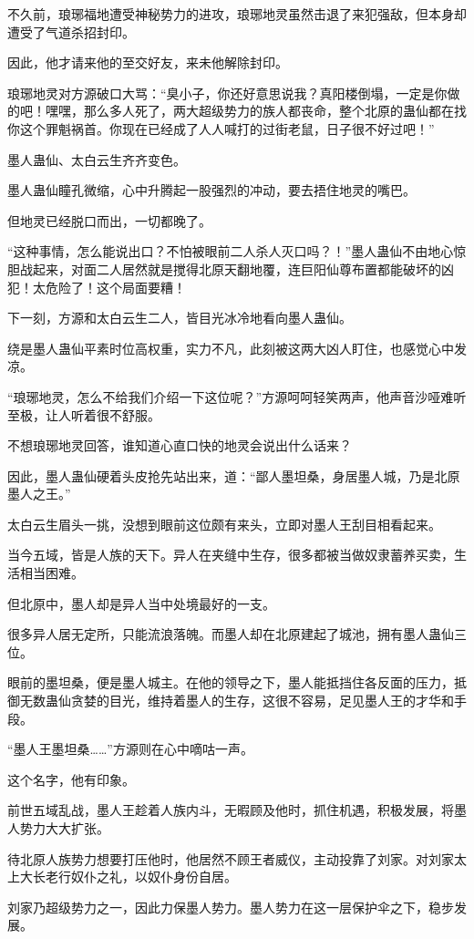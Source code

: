 \begin{this_body}
不久前，琅琊福地遭受神秘势力的进攻，琅琊地灵虽然击退了来犯强敌，但本身却遭受了气道杀招封印。

因此，他才请来他的至交好友，来未他解除封印。

琅琊地灵对方源破口大骂：“臭小子，你还好意思说我？真阳楼倒塌，一定是你做的吧！嘿嘿，那么多人死了，两大超级势力的族人都丧命，整个北原的蛊仙都在找你这个罪魁祸首。你现在已经成了人人喊打的过街老鼠，日子很不好过吧！”

墨人蛊仙、太白云生齐齐变色。

墨人蛊仙瞳孔微缩，心中升腾起一股强烈的冲动，要去捂住地灵的嘴巴。

但地灵已经脱口而出，一切都晚了。

“这种事情，怎么能说出口？不怕被眼前二人杀人灭口吗？！”墨人蛊仙不由地心惊胆战起来，对面二人居然就是搅得北原天翻地覆，连巨阳仙尊布置都能破坏的凶犯！太危险了！这个局面要糟！

下一刻，方源和太白云生二人，皆目光冰冷地看向墨人蛊仙。

绕是墨人蛊仙平素时位高权重，实力不凡，此刻被这两大凶人盯住，也感觉心中发凉。

“琅琊地灵，怎么不给我们介绍一下这位呢？”方源呵呵轻笑两声，他声音沙哑难听至极，让人听着很不舒服。

不想琅琊地灵回答，谁知道心直口快的地灵会说出什么话来？

因此，墨人蛊仙硬着头皮抢先站出来，道：“鄙人墨坦桑，身居墨人城，乃是北原墨人之王。”

太白云生眉头一挑，没想到眼前这位颇有来头，立即对墨人王刮目相看起来。

当今五域，皆是人族的天下。异人在夹缝中生存，很多都被当做奴隶蓄养买卖，生活相当困难。

但北原中，墨人却是异人当中处境最好的一支。

很多异人居无定所，只能流浪落魄。而墨人却在北原建起了城池，拥有墨人蛊仙三位。

眼前的墨坦桑，便是墨人城主。在他的领导之下，墨人能抵挡住各反面的压力，抵御无数蛊仙贪婪的目光，维持着墨人的生存，这很不容易，足见墨人王的才华和手段。

“墨人王墨坦桑……”方源则在心中嘀咕一声。

这个名字，他有印象。

前世五域乱战，墨人王趁着人族内斗，无暇顾及他时，抓住机遇，积极发展，将墨人势力大大扩张。

待北原人族势力想要打压他时，他居然不顾王者威仪，主动投靠了刘家。对刘家太上大长老行奴仆之礼，以奴仆身份自居。

刘家乃超级势力之一，因此力保墨人势力。墨人势力在这一层保护伞之下，稳步发展。


\end{this_body}
